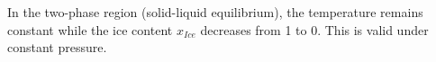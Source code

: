 In the two-phase region (solid-liquid equilibrium), the temperature remains constant while the ice content \( x_{Ice} \) decreases from 1 to 0. This is valid under constant pressure.